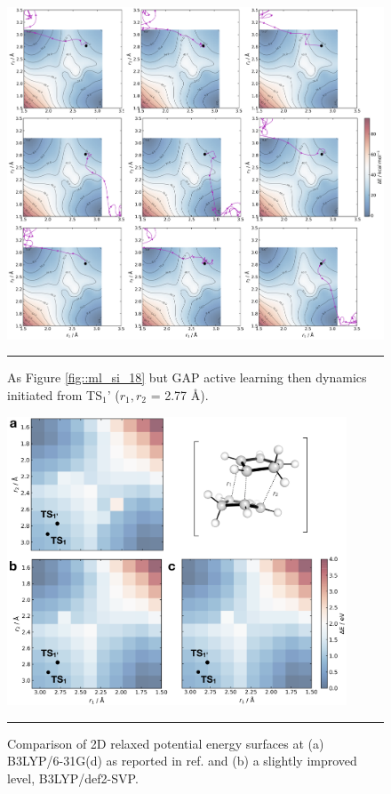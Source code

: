 \documentclass[../../main.tex]{subfiles}
\begin{document}
\begin{figure}[h!]
	\vspace{0.4cm}
	\centering
	\includegraphics[width=\textwidth]{6/gap/figs_si/fig20}
	\vspace{0.2cm}
	\hrule
	\caption{As Figure \ref{fig::ml_si_18} but GAP active learning then dynamics initiated from TS${}_1’$ ($r_1, r_2$ = 2.77 \AA).}
	\label{fig::ml_si_20}
\end{figure}



\begin{figure}[h!]
	\vspace{0.4cm}
	\centering
	\includegraphics[width=0.9\textwidth]{6/gap/figs_si/fig21}
	\vspace{0.2cm}
	\hrule
	\caption{Comparison of 2D relaxed potential energy surfaces at (a) B3LYP/6-31G(d) as reported in ref. \cite{Caramella2002} and (b) a slightly improved level, B3LYP/def2-SVP.}
	\label{fig::ml_si_21}
\end{figure}
\end{document}
